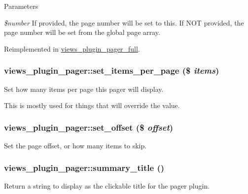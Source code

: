 \begin{DoxyParams}{Parameters}
\item[{\em \$number}]If provided, the page number will be set to this. If NOT provided, the page number will be set from the global page array. \end{DoxyParams}


Reimplemented in \hyperlink{classviews__plugin__pager__full_a503e0a6ea9e4815d712d36b1911d61bb}{views\_\-plugin\_\-pager\_\-full}.\hypertarget{classviews__plugin__pager_aeebe569dd61b8a402d7349a9ac5a7096}{
\subsubsection[{set\_\-items\_\-per\_\-page}]{\setlength{\rightskip}{0pt plus 5cm}views\_\-plugin\_\-pager::set\_\-items\_\-per\_\-page (\$ {\em items})}}
\label{classviews__plugin__pager_aeebe569dd61b8a402d7349a9ac5a7096}
Set how many items per page this pager will display.

This is mostly used for things that will override the value. \hypertarget{classviews__plugin__pager_a115eca3dda0b25083b10148dcf2a1f61}{
\subsubsection[{set\_\-offset}]{\setlength{\rightskip}{0pt plus 5cm}views\_\-plugin\_\-pager::set\_\-offset (\$ {\em offset})}}
\label{classviews__plugin__pager_a115eca3dda0b25083b10148dcf2a1f61}
Set the page offset, or how many items to skip. \hypertarget{classviews__plugin__pager_a12df2a012d53b9276a14fae94511f686}{
\subsubsection[{summary\_\-title}]{\setlength{\rightskip}{0pt plus 5cm}views\_\-plugin\_\-pager::summary\_\-title ()}}
\label{classviews__plugin__pager_a12df2a012d53b9276a14fae94511f686}
Return a string to display as the clickable title for the pager plugin. 

